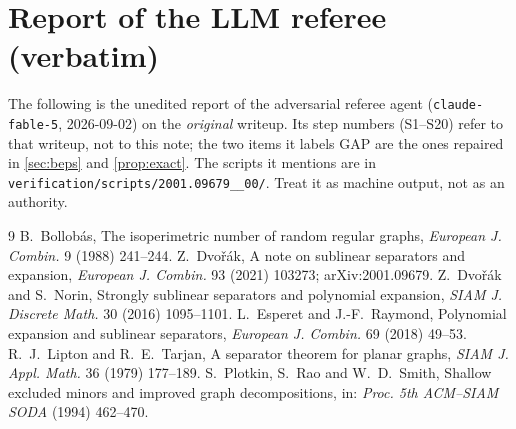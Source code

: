 \documentclass[11pt,a4paper]{article}
\theoremstyle{plain}
\theoremstyle{definition}
\theoremstyle{remark}
\begin{document}
\section{Report of the LLM referee (verbatim)}\label{app:referee}

\begin{tcolorbox}[colback=gray!8,colframe=gray!50,boxrule=0.4pt,arc=2pt]
\small The following is the unedited report of the adversarial referee agent (\texttt{claude-fable-5}, 2026-09-02) on the \emph{original} writeup. Its step numbers (S1--S20) refer to that writeup, not to this note; the two items it labels GAP are the ones repaired in \cref{sec:beps} and \cref{prop:exact}. The scripts it mentions are in \texttt{verification/scripts/2001.09679\_\_00/}. Treat it as machine output, not as an authority.
\end{tcolorbox}



\begin{thebibliography}{9}
 B.~Bollobás, The isoperimetric number of random regular graphs, \emph{European J. Combin.} 9 (1988) 241--244.
 Z.~Dvořák, A note on sublinear separators and expansion, \emph{European J. Combin.} 93 (2021) 103273; arXiv:2001.09679.
 Z.~Dvořák and S.~Norin, Strongly sublinear separators and polynomial expansion, \emph{SIAM J. Discrete Math.} 30 (2016) 1095--1101.
 L.~Esperet and J.-F.~Raymond, Polynomial expansion and sublinear separators, \emph{European J. Combin.} 69 (2018) 49--53.
 R.~J.~Lipton and R.~E.~Tarjan, A separator theorem for planar graphs, \emph{SIAM J. Appl. Math.} 36 (1979) 177--189.
 S.~Plotkin, S.~Rao and W.~D.~Smith, Shallow excluded minors and improved graph decompositions, in: \emph{Proc. 5th ACM--SIAM SODA} (1994) 462--470.
\end{thebibliography}
\end{document}
